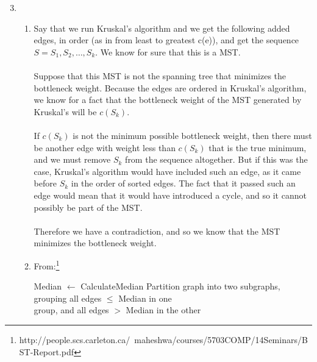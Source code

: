 
\usepackage{amsmath, verbatim, tikz, float, pgfplots, framed}
\usepackage[]{algorithm2e}

\usetikzlibrary{arrows,automata}

\oddsidemargin 0in
\evensidemargin 0in
\textwidth 6.5in
\topmargin -0.5in
\textheight 9.0in
\newcommand{\norm}[1]{\left\lVert #1 \right\rVert}


\pagestyle{myheadings}

\begin{enumerate}
  \setcounter{enumi}{2}
  \item
    \begin{enumerate}
      \item
        Say that we run Kruskal's algorithm and we get the following added edges, in order (as in from least to greatest c(e)), and get the sequence $S = S_1, S_2, \ldots, S_k$. We know for sure that this is a MST.\\\\
        Suppose that this MST is not the spanning tree that minimizes the bottleneck weight. Because the edges are ordered in Kruskal's algorithm, we know for a fact that the bottleneck weight of the MST generated by Kruskal's will be $c(S_k)$. \\\\
        If $c(S_k)$ is not the minimum possible bottleneck weight, then there must be another edge with weight less than $c(S_k)$ that is the true minimum, and we must remove $S_k$ from the sequence altogether. But if this was the case, Kruskal's algorithm would have included such an edge, as it came before $S_k$ in the order of sorted edges. The fact that it passed such an edge would mean that it would have introduced a cycle, and so it cannot possibly be part of the MST.\\\\
        Therefore we have a contradiction, and so we know that the MST minimizes the bottleneck weight.

      \item
        From:\footnote{http://people.scs.carleton.ca/~maheshwa/courses/5703COMP/14Seminars/BST-Report.pdf}
        \begin{framed}
          \begin{algorithm}[H]      
            Median $\gets$ CalculateMedian\;
            Partition graph into two subgraphs, grouping all edges $\leq$ Median in one\\
            group, and all edges $>$ Median in the other\;
            

\end{algorithm}
\end{framed}
\end{enumerate}
\end{enumerate}
